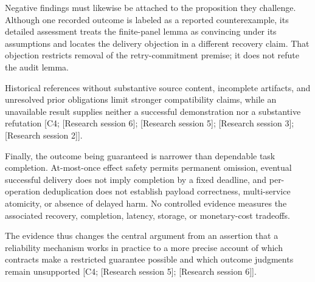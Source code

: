 \documentclass[11pt]{article}
\begin{document}
Negative findings must likewise be attached to the proposition they challenge. Although one recorded outcome is labeled as a reported counterexample, its detailed assessment treats the finite-panel lemma as convincing under its assumptions and locates the delivery objection in a different recovery claim. That objection restricts removal of the retry-commitment premise; it does not refute the audit lemma.

Historical references without substantive source content, incomplete artifacts, and unresolved prior obligations limit stronger compatibility claims, while an unavailable result supplies neither a successful demonstration nor a substantive refutation [C4; [Research session 6]; [Research session 5]; [Research session 3]; [Research session 2]].

Finally, the outcome being guaranteed is narrower than dependable task completion. At-most-once effect safety permits permanent omission, eventual successful delivery does not imply completion by a fixed deadline, and per-operation deduplication does not establish payload correctness, multi-service atomicity, or absence of delayed harm. No controlled evidence measures the associated recovery, completion, latency, storage, or monetary-cost tradeoffs.

The evidence thus changes the central argument from an assertion that a reliability mechanism works in practice to a more precise account of which contracts make a restricted guarantee possible and which outcome judgments remain unsupported [C4; [Research session 5]; [Research session 6]].
\end{document}

